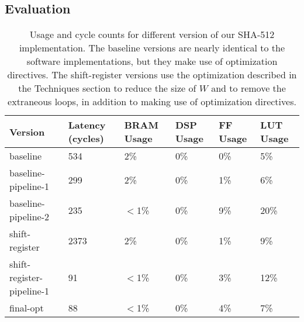 \subsection{Evaluation}
\begin{table}[h]
\centering
\begin{tabular}{@{}llllll@{}}
\toprule
Version                   & Latency (cycles) & BRAM Usage & DSP Usage & FF Usage & LUT Usage \\ \midrule
baseline                  & 534              & 2\%         & 0\%        & 0\%       & 5\%    \\
baseline-pipeline-1       & 299              & 2\%         & 0\%        & 1\%       & 6\%    \\
baseline-pipeline-2       & 235              & $<$1\%      & 0\%        & 9\%       & 20\%   \\
shift-register            & 2373             & 2\%         & 0\%        & 1\%       & 9\%    \\
shift-register-pipeline-1 & 91               & $<$1\%      & 0\%        & 3\%       & 12\%   \\
final-opt                 & 88               & $<$1\%      & 0\%        & 4\%       & 7\%   \\ \bottomrule
\end{tabular}
\caption{Usage and cycle counts for different version of our SHA-512 implementation. The baseline
versions are nearly identical to the software implementations, but they make use of optimization
directives. The shift-register versions use the optimization described in the Techniques section to
reduce the size of $W$ and to remove the extraneous loops, in addition to making use of optimization
directives.}
\label{table:shausage}
\end{table}

